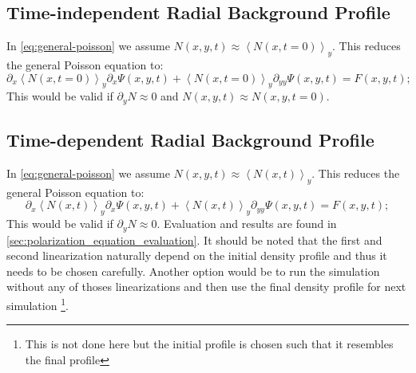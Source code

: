 \documentclass[master.tex]{subfiles}
\begin{document}
\subsection{Time-independent Radial Background Profile}
In \autoref{eq:general-poisson} we assume $N(x,y,t) \approx \left<N(x,t = 0)\right>_y$. This reduces the general Poisson equation to:
\begin{equation}
    \partial_x \left<N(x,t = 0)\right>_y \partial_x \Psi(x,y,t) + \left<N(x,t = 0)\right>_y \partial_{yy} \Psi(x,y,t) = F(x,y,t);
\end{equation}
This would be valid if $\partial_y N \approx 0$ and $N(x,y,t) \approx N(x,y, t= 0)$.

\subsection{Time-dependent Radial Background Profile}
In \autoref{eq:general-poisson} we assume $N(x,y,t) \approx \left<N(x,t)\right>_y$. This reduces the general Poisson equation to:
\begin{equation}
    \partial_x \left<N(x,t)\right>_y \partial_x \Psi(x,y,t) + \left<N(x,t)\right>_y \partial_{yy} \Psi(x,y,t) = F(x,y,t);
\end{equation}
This would be valid if $\partial_y N \approx 0$.
\newline
Evaluation and results are found in \autoref{sec:polarization_equation_evaluation}. It should be noted that the first and second linearization naturally depend on the initial density profile and thus it needs to be chosen carefully. Another option would be to run the simulation without any of thoses linearizations and then use the final density profile for next simulation \footnote{This is not done here but the initial profile is chosen such that it resembles the final profile}.
\end{document}
